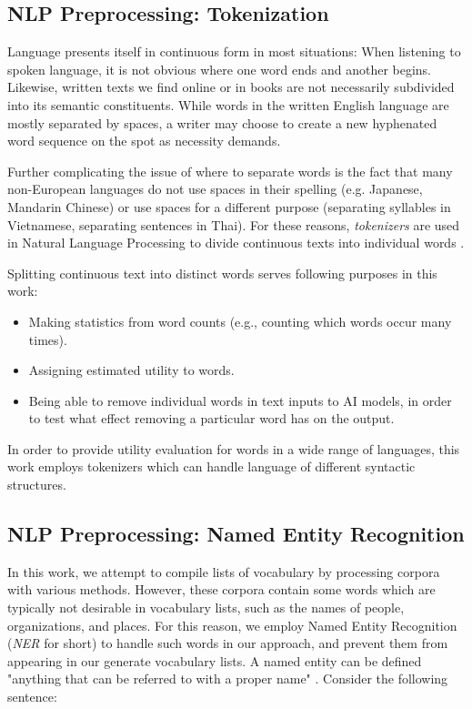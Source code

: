 \subsection{NLP Preprocessing: Tokenization}
Language presents itself in continuous form in most situations:
When listening to spoken language, it is not obvious where one word ends and another begins.
Likewise, written texts we find online or in books are not necessarily subdivided into its semantic constituents.
While words in the written English language are mostly separated by spaces, a writer may choose to create a new hyphenated word sequence on the spot as necessity demands.

Further complicating the issue of where to separate words is the fact that many non-European languages do not use spaces in their spelling (e.g. Japanese, Mandarin Chinese) or use spaces for a different purpose (separating syllables in Vietnamese, separating sentences in Thai).
For these reasons, \textit{tokenizers} are used in Natural Language Processing to divide continuous texts into individual words \cite{jurafskySpeechLanguageProcessing2025}.

Splitting continuous text into distinct words serves following purposes in this work:
\begin{itemize}
	\item Making statistics from word counts (e.g., counting which words occur many times).
	\item Assigning estimated utility to words.
	\item Being able to remove individual words in text inputs to AI models, in order to test what effect removing a particular word has on the output.
\end{itemize}

In order to provide utility evaluation for words in a wide range of languages, this work employs tokenizers which can handle language of different syntactic structures.

\subsection{NLP Preprocessing: Named Entity Recognition}
In this work, we attempt to compile lists of vocabulary by processing corpora with various methods.
However, these corpora contain some words which are typically not desirable in vocabulary lists, such as the names of people, organizations, and places.
For this reason, we employ Named Entity Recognition \cite{jurafskySpeechLanguageProcessing2025} (\textit{NER} for short) to handle such words in our approach, and prevent them from appearing in our generate vocabulary lists.
A named entity can be defined "anything that can be referred to with a proper name" \cite{jurafskySpeechLanguageProcessing2025}.
Consider the following sentence:

